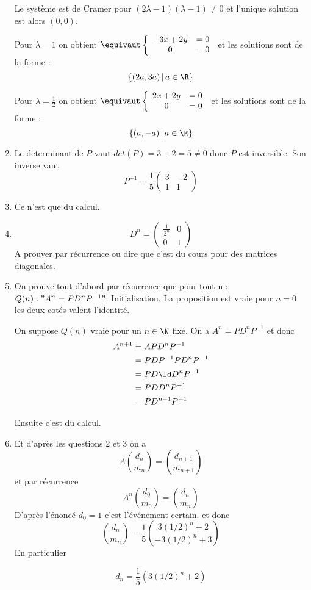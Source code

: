 \documentclass[a4paper, 11pt,reqno]{article}
\begin{document}
\begin{correction}
\begin{enumerate}
Le système est de Cramer pour $(2\lambda-1)(\lambda-1)\neq 0$ et l'unique solution est alors $(0,0)$. 

Pour $\lambda=1$ on obtient 
$\equivaut
\left\{  
\begin{array}{cc}
-3 x +2y  &=0\\
0 &=0
\end{array}\right.
$
et les solutions sont de la forme : 
$$\{ (2a,3a ) \, |\, a\in \R\} $$

Pour $\lambda=\frac{1}{2}$ on obtient 
$\equivaut
\left\{  
\begin{array}{cc}
2 x +2y  &=0\\
0 &=0
\end{array}\right.
$
et les solutions sont de la forme : 
$$\{ (a,-a ) \, |\, a\in \R\} $$

\item Le determinant de $P$ vaut $det(P) = 3+2 = 5 \neq 0$ donc $P$ est inversible. 
Son inverse vaut 
$$P^{-1} = \frac{1}{5} \left( 
\begin{array}{cc}
3 & -2 \\
1 & 1
\end{array}
\right)$$

\item Ce n'est que du calcul. 

\item $$D^n =  \left( 
\begin{array}{cc}
\frac{1}{2^n}& 0 \\
0 & 1
\end{array}
\right)$$
A prouver par récurrence ou  dire que c'est du cours pour des matrices diagonales. 
\item 
On prouve tout d'abord par récurrence que pour tout n :
$Q(n) : " A^n = P D^n P^{-1} "$.
Initialisation. La proposition est vraie pour $n=0$ les deux cotés valent l'identité. 

On suppose $Q(n) $ vraie pour un $n \in \N$ fixé. On a 
$A^{n} =   P D^n P^{-1}$ et donc
\begin{align*}
A^{n+1} &=A P D^n P^{-1}\\
&=PDP^{-1} P D^n P^{-1} \\
&= PD \Id D^n P^{-1}  \\
&=PD  D^n P^{-1}\\
&=PD^{n+1} P^{-1}
\end{align*}

Ensuite c'est du calcul. 
\item 
Et d'après les questions 2 et 3 on  a
$$A \binom{d_n}{m_n}= \binom{d_{n+1}}{m_{n+1}}$$
et par récurrence 
$$A^n \binom{d_0}{m_0}= \binom{d_n}{m_n}$$
D'après l'énoncé $d_0= 1$ c'est l'événement certain. 
et donc $$ \binom{d_n}{m_n}= 
\frac{1}{5} \binom{3\left( 1/2\right)^n +2 }{-3\left( 1/2\right)^n +3}$$
En particulier 

$$d_n=\frac{1}{5} (3\left( 1/2\right)^n +2) $$

\end{enumerate}
\end{correction}
\end{document}
